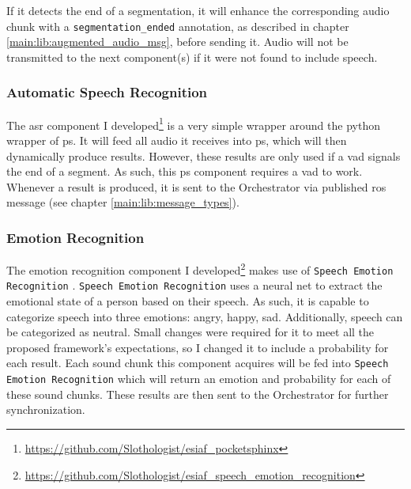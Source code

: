 If it detects the end of a segmentation, it will enhance the corresponding audio chunk with a \texttt{segmentation\_ended} annotation, as described in chapter \ref{main:lib:augmented_audio_msg}, before sending it.
Audio will not be transmitted to the next component(s) if it were not found to include speech.

\subsubsection{Automatic Speech Recognition}
\label{main:components:ps}
The \gls{asr} component I developed\footnote{\url{https://github.com/Slothologist/esiaf_pocketsphinx}} is a very simple wrapper around the python wrapper of \gls{ps}.
It will feed all audio it receives into \gls{ps}, which will then dynamically produce results.
However, these results are only used if a \gls{vad} signals the end of a segment.
As such, this \gls{ps} component requires a \gls{vad} to work.
Whenever a result is produced, it is sent to the Orchestrator via published \gls{ros} message (see chapter \ref{main:lib:message_types}).

\subsubsection{Emotion Recognition}
\label{main:components:emotion}
The emotion recognition component I developed\footnote{\url{https://github.com/Slothologist/esiaf_speech_emotion_recognition}} makes use of \texttt{Speech Emotion Recognition} \cite{speech-em-rec}.
\texttt{Speech Emotion Recognition} uses a neural net to extract the emotional state of a person based on their speech.
As such, it is capable to categorize speech into three emotions: angry, happy, sad.
Additionally, speech can be categorized as neutral.
Small changes were required for it to meet all the proposed framework's expectations, so I changed it to include a probability for each result. %
Each sound chunk this component acquires will be fed into \texttt{Speech Emotion Recognition} which will return an emotion and probability for each of these sound chunks.
These results are then sent to the Orchestrator for further synchronization.


